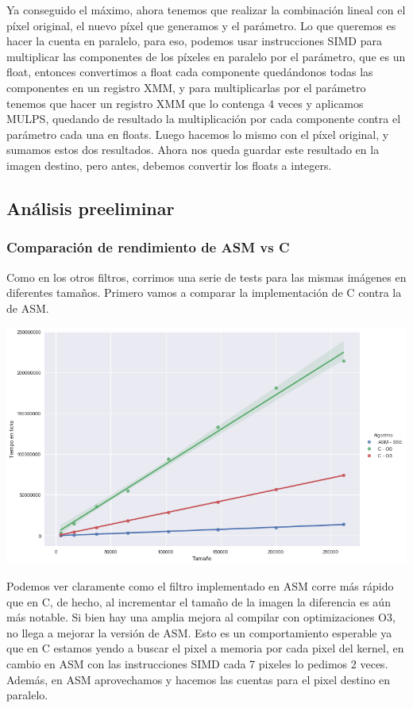 Ya conseguido el máximo, ahora tenemos que realizar la combinación lineal con el píxel original, el nuevo píxel que generamos y el parámetro. Lo que queremos es hacer la cuenta en paralelo, para eso, podemos usar instrucciones SIMD para multiplicar las componentes de los píxeles en paralelo por el parámetro, que es un float, entonces convertimos a float cada componente quedándonos todas las componentes en un registro XMM, y para multiplicarlas por el parámetro tenemos que hacer un registro XMM que lo contenga 4 veces y aplicamos MULPS, quedando de resultado la multiplicación por cada componente contra el parámetro cada una en floats. Luego hacemos lo mismo con el píxel original, y sumamos estos dos resultados. Ahora nos queda guardar este resultado en la imagen destino, pero antes, debemos convertir los floats a integers.

\subsection{Análisis preeliminar}
\subsubsection*{Comparación de rendimiento de ASM vs C}
Como en los otros filtros, corrimos una serie de tests para las mismas imágenes en diferentes tamaños. Primero vamos a comparar la implementación de C contra la de ASM.

\begin{center}
	\includegraphics[scale=0.5]{img/maxCloser_CvsASMvsO3.png}
\end{center}

Podemos ver claramente como el filtro implementado en ASM corre más rápido que en C, de hecho, al incrementar el tamaño de la imagen la diferencia es aún más notable. Si bien hay una amplia mejora al compilar con optimizaciones O3, no llega a mejorar la versión de ASM. Esto es un comportamiento esperable ya que en C estamos yendo a buscar el pixel a memoria por cada pixel del kernel, en cambio en ASM con las instrucciones SIMD cada 7 pixeles lo pedimos 2 veces. Además, en ASM aprovechamos y hacemos las cuentas para el pixel destino en paralelo.

